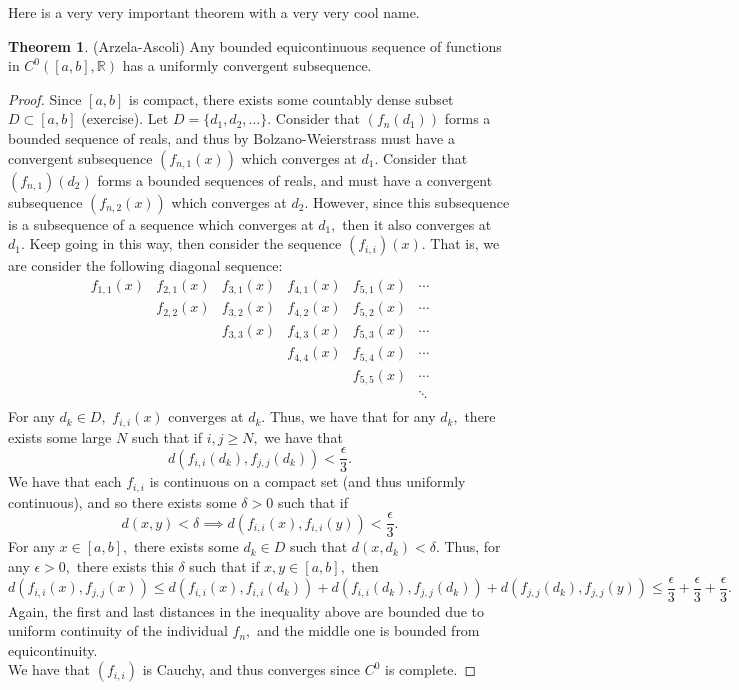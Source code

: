 \documentclass[10pt, oneside]{article}
\newcommand{\bbR}{\mathbb{R}}
\theoremstyle{definition}
\newtheorem{thm}{Theorem}
\begin{document}
Here is a very very important theorem with a very very cool name.
\begin{thm}
    (Arzela-Ascoli) Any bounded equicontinuous sequence of functions in $C^0([a,b], \bbR)$ has a uniformly convergent subsequence.
\end{thm}
\begin{proof}
Since $[a,b]$ is compact, there exists some countably dense subset $D \subset [a,b]$ (exercise). Let $D = \{d_1, d_2, \dots\}.$ Consider that $(f_n(d_1))$ forms a bounded sequence of reals, and thus by Bolzano-Weierstrass must have a convergent subsequence $(f_{n, 1}(x))$ which converges at $d_1.$ Consider that $(f_{n, 1})(d_2)$ forms a bounded sequences of reals, and must have a convergent subsequence $(f_{n,2}(x))$ which converges at $d_2.$ However, since this subsequence is a subsequence of a sequence which converges at $d_1,$ then it also converges at $d_1.$ Keep going in this way, then consider the sequence $(f_{i,i})(x).$ That is, we are consider the following diagonal sequence:
\[
\begin{array}{ccccccc}
f_{1,1}(x) & f_{2,1}(x)& f_{3,1}(x) & f_{4,1}(x) & f_{5,1}(x) & \cdots \\
         & f_{2,2}(x) & f_{3,2}(x) & f_{4,2}(x) & f_{5,2}(x) & \cdots \\
         &          & f_{3,3}(x) & f_{4,3}(x) & f_{5,3}(x) & \cdots \\
         &          &          & f_{4,4}(x) & f_{5,4}(x) & \cdots \\
         &          &          &          & f_{5,5}(x) & \cdots \\
         &          &          &          &          & \ddots \\
\end{array}
\]
For any $d_k \in D,$ $f_{i,i}(x)$ converges at $d_k.$ Thus, we have that for any $d_k,$ there exists some large $N$ such that if $i, j \geq N,$ we have that 
\[d(f_{i,i}(d_k), f_{j,j}(d_k))< \frac{\epsilon}{3}.\] We have that each $f_{i,i}$ is continuous on a compact set (and thus uniformly continuous), and so there exists some $\delta>0$ such that if 
\[d(x,y)< \delta \implies d(f_{i,i}(x), f_{i,i}(y))< \frac{\epsilon}{3}.\] For any $x\in [a,b],$ there exists some $d_k \in D$ such that $d(x, d_k)< \delta.$ Thus, for any $\epsilon>0,$ there exists this $\delta$ such that if $x,y \in [a,b],$ then 
\[d(f_{i,i}(x), f_{j,j}(x))\leq d(f_{i,i}(x), f_{i,i}(d_k)) + d(f_{i,i}(d_k), f_{j,j}(d_k)) + d(f_{j,j}(d_k), f_{j,j}(y))\leq \frac{\epsilon}{3} + \frac{\epsilon}{3} + \frac{\epsilon}{3}.\] Again, the first and last distances in the inequality above are bounded due to uniform continuity of the individual $f_n,$ and the middle one is bounded from equicontinuity.\\

We have that $(f_{i,i})$ is Cauchy, and thus converges  since $C^0$ is complete.
\end{proof}
\end{document}
